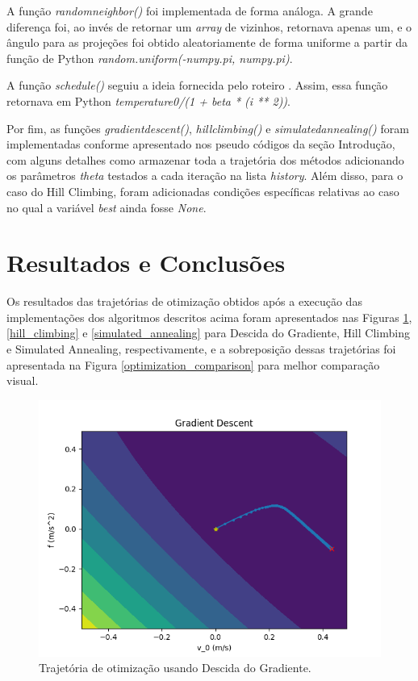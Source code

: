 \documentclass[conference]{IEEEtran}
\begin{document}
A função \textit{random\underline{\space}neighbor()} foi implementada de forma análoga. A grande diferença foi, ao invés de retornar um \textit{array} de vizinhos, retornava apenas um, e o ângulo para as projeções foi obtido aleatoriamente de forma uniforme a partir da função de Python \textit{random.uniform(-numpy.pi, numpy.pi)}.

A função \textit{schedule()} seguiu a ideia fornecida pelo roteiro \cite{b1}. Assim, essa função retornava em Python \textit{temperature0/(1 + beta * (i ** 2))}.

Por fim, as funções \textit{gradient\underline{\space}descent()}, \textit{hill\underline{\space}climbing()} e \textit{simulated\underline{\space}annealing()} foram implementadas conforme apresentado nos pseudo códigos da seção Introdução, com alguns detalhes como armazenar toda a trajetória dos métodos adicionando os parâmetros \textit{theta} testados a cada iteração na lista \textit{history}. Além disso, para o caso do Hill Climbing, foram adicionadas condições específicas relativas ao caso no qual a variável \textit{best} ainda fosse \textit{None}. 

\section{Resultados e Conclusões}
Os resultados das trajetórias de otimização obtidos após a execução das implementações dos algoritmos descritos acima foram apresentados nas Figuras \ref{gradient_descent}, \ref{hill_climbing} e \ref{simulated_annealing} para Descida do Gradiente, Hill Climbing e Simulated Annealing, respectivamente, e a sobreposição dessas trajetórias foi apresentada na Figura \ref{optimization_comparison} para melhor comparação visual.

\begin{figure}[htbp]
\centering
\centerline{\includegraphics[scale=0.4]{gradient_descent.png}}
\caption{Trajetória de otimização usando Descida do Gradiente.}
\label{gradient_descent}
\end{figure}
\end{document}
